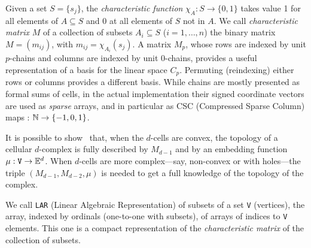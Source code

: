 Given a set $S=\{s_j\}$, the \emph{characteristic function} $\chi_A: S\to\{0,1\}$ takes value 1 for all elements of $A\subseteq S$ and 0 at all elements of $S$ not in $A$. 
We call \emph{characteristic matrix} $M$ of a collection of subsets $A_i\subseteq S$ ($i=1,\ldots,n$) the binary  matrix $M=(m_{ij})$, with $m_{ij} = \chi_{A_i}(s_j)$. {A  matrix $M_p$, whose rows are indexed by unit $p$-chains and columns are indexed by unit $0$-chains, provides a useful representation of a basis for the linear space $C_p$. Permuting (reindexing) either rows or columns provides a different basis.}   While chains are mostly presented as formal sums of cells, in the actual implementation their signed coordinate vectors are used as \emph{sparse} arrays, and in particular as CSC (Compressed Sparse Column) maps : $\mathbb{N}\to\{-1,0,1\}$.

It is possible to show~\cite{} that, when the $d$-cells are convex, the topology of a cellular $d$-complex is fully described by $M_{d-1}$ and by an embedding function $\mu: \texttt{V}\to \mathbb{E}^d$. When $d$-cells are more complex---say, non-convex or with holes---the triple $(M_{d-1}, M_{d-2}, \mu)$ is needed to get a full knowledge of the topology of the complex.

We call \texttt{LAR} (Linear Algebraic Representation) of subsets of a set \texttt{V} (vertices), the array, indexed by ordinals (one-to-one with subsets), of arrays of indices to \texttt{V} elements. This one is a compact representation of the \emph{characteristic matrix} of the collection of subsets.


